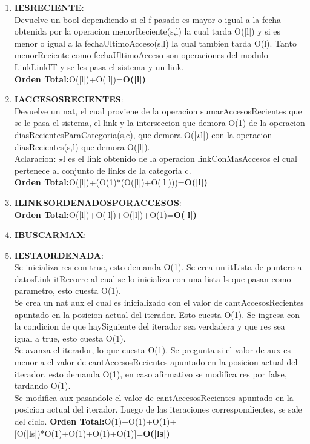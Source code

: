 \documentclass[10pt, a4paper]{article}
\begin{document}
\begin{enumerate}
\item \textbf{IESRECIENTE}:\\ Devuelve un bool dependiendo si el f pasado es mayor o igual a la fecha obtenida por la operacion menorReciente(s,l) la cual tarda O(|l|) y si es menor o igual a la fechaUltimoAcceso(s,l) la cual tambien tarda O(l). Tanto menorReciente como fechaUltimoAcceso son operaciones del modulo LinkLinkIT y se les pasa el sistema y un link.\\
\textbf{Orden Total:}O(|l|)+O(|l|)=\textbf{O(|l|)}
      
     \item \textbf{IACCESOSRECIENTES}:\\ Devuelve un nat, el cual proviene de la operacion sumarAccesosRecientes que se le pasa el sistema, el link y la interseccion que demora O(1) de la operacion diasRecientesParaCategoria(s,c), que demora O(|$\star$l|) con la operacion diasRecientes(s,l) que demora O(|l|).\\
Aclaracion: $\star$l es el link obtenido de la operacion linkConMasAccesos el cual pertenece al conjunto de links de la categoria c. \\
\textbf{Orden Total:}O(|l|)+(O(1)*(O(|l|)+O(|l|)))=\textbf{O(|l|)}

     \item \textbf{ILINKSORDENADOSPORACCESOS}:\\ 

\textbf{Orden Total:}O(|l|)+O(|l|)+O(|l|)+O(1)=\textbf{O(|l|)}

\item \textbf{IBUSCARMAX}:\\ 
      
     \item \textbf{IESTAORDENADA}:\\ Se inicializa res con true, esto demanda O(1). Se crea un itLista de puntero a datosLink itRecorre al cual se lo inicializa con una lista ls que pasan como parametro, esto cuesta O(1). \\
Se crea un nat aux el cual es inicializado con el valor de cantAccesosRecientes apuntado en la posicion actual del iterador. Esto cuesta O(1). Se ingresa con la condicion de que haySiguiente del iterador sea verdadera y que res sea igual a true, esto cuesta O(1). \\
Se avanza el iterador, lo que cuesta O(1). Se pregunta si el valor de aux es menor a el valor de cantAccesosRecientes apuntado en la posicion actual del iterador, esto demanda O(1), en caso afirmativo se modifica res por false, tardando O(1). \\
Se modifica aux pasandole el valor de cantAccesosRecientes apuntado en la posicion actual del iterador. Luego de las iteraciones correspondientes, se sale del ciclo. 
\textbf{Orden Total:}O(1)+O(1)+O(1)+[O(|ls|)*O(1)+O(1)+O(1)+O(1)]=\textbf{O(|ls|)}


\end{enumerate}
\end{document}
